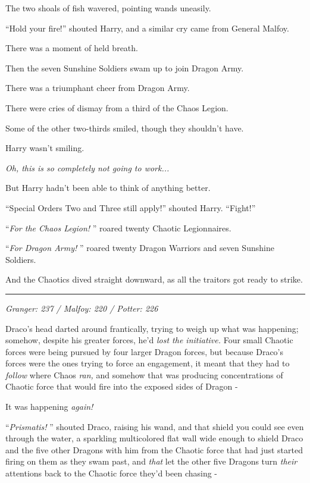 The two shoals of fish wavered, pointing wands uneasily.

``Hold your fire!'' shouted Harry, and a similar cry came from General
Malfoy.

There was a moment of held breath.

Then the seven Sunshine Soldiers swam up to join Dragon Army.

There was a triumphant cheer from Dragon Army.

There were cries of dismay from a third of the Chaos Legion.

Some of the other two-thirds smiled, though they shouldn't have.

Harry wasn't smiling.

\emph{Oh, this is so completely not going to work...}

But Harry hadn't been able to think of anything better.

``Special Orders Two and Three still apply!'' shouted Harry. ``Fight!''

``\emph{For the Chaos Legion!} '' roared twenty Chaotic Legionnaires.

``\emph{For Dragon Army!} '' roared twenty Dragon Warriors and seven
Sunshine Soldiers.

And the Chaotics dived straight downward, as all the traitors got ready
to strike.

\begin{center}\rule{3in}{0.4pt}\end{center}

\emph{Granger: 237 / Malfoy: 220 / Potter: 226}

Draco's head darted around frantically, trying to weigh up what was
happening; somehow, despite his greater forces, he'd \emph{lost the
initiative.} Four small Chaotic forces were being pursued by four larger
Dragon forces, but because Draco's forces were the ones trying to force
an engagement, it meant that they had to \emph{follow} where Chaos
\emph{ran,} and somehow that was producing concentrations of Chaotic
force that would fire into the exposed sides of Dragon -

It was happening \emph{again!}

``\emph{Prismatis!} '' shouted Draco, raising his wand, and that shield
you could see even through the water, a sparkling multicolored flat wall
wide enough to shield Draco and the five other Dragons with him from the
Chaotic force that had just started firing on them as they swam past,
and \emph{that} let the other five Dragons turn \emph{their} attentions
back to the Chaotic force they'd been chasing -

